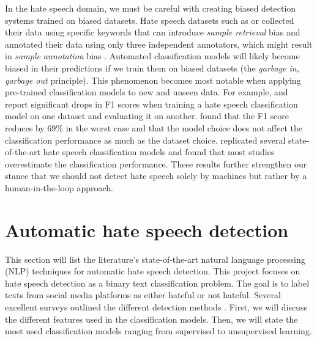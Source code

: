 %
In the hate speech domain, we must be careful with creating biased detection systems trained on biased datasets.
%
%
%
Hate speech datasets such as \citet{waseem2016hateful} or \citet{basile2019semeval} collected their data using specific keywords that can introduce \textit{sample retrieval} bias and annotated their data using only three independent annotators, which might result in \textit{sample annotation} bias \citep{balayn2021automatic}.
%
Automated classification models will likely become biased in their predictions if we train them on biased datasets (the \emph{garbage in, garbage out} principle).
%
This phenomenon becomes most notable when applying pre-trained classification models to new and unseen data.
%
For example, \citet{grondahl2018all} and \citet{arango2019hate} report significant drops in F1 scores when training a hate speech classification model on one dataset and evaluating it on another.
%
\citet{grondahl2018all} found that the F1 score reduces by 69\% in the worst case and that the model choice does not affect the classification performance as much as the dataset choice.
%
\citet{arango2019hate} replicated several state-of-the-art hate speech classification models and found that most studies overestimate the classification performance.
%
These results further strengthen our stance that we should not detect hate speech solely by machines but rather by a human-in-the-loop approach.

\section{Automatic hate speech detection}
\label{sec:related-work-detection-algorithms}
%
This section will list the literature's state-of-the-art natural language processing (NLP) techniques for automatic hate speech detection.
%
This project focuses on hate speech detection as a binary text classification problem.
%
The goal is to label texts from social media platforms as either hateful or not hateful.
%
Several excellent surveys outlined the different detection methods \citep{fortuna2018survey, schmidt2019survey}.
%
First, we will discuss the different features used in the classification models.
%
Then, we will state the most used classification models ranging from supervised to unsupervised learning.
%

